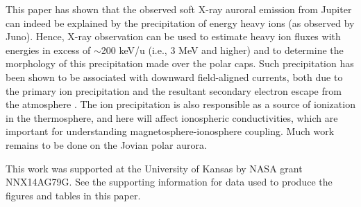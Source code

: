 \documentclass[draft]{agujournal2018}
\begin{document}
This paper has shown that the observed soft X-ray auroral emission from Jupiter can indeed be explained by the precipitation of energy heavy ions (as observed by Juno).
Hence, X-ray observation can be used to estimate heavy ion fluxes with energies in excess of $\sim$200 keV/u (i.e., 3 MeV and higher) and to determine the morphology of this precipitation made over the polar caps.
Such precipitation has been shown to be associated with downward field-aligned currents, both due to the primary ion precipitation and the resultant secondary electron escape from the atmosphere \citep{cravens2003,houston2018,ozak2010,ozak2013}.
The ion precipitation is also responsible as a source of ionization in the thermosphere, and here will affect ionospheric conductivities, which are important for understanding magnetosphere-ionosphere coupling.
Much work remains to be done on the Jovian polar aurora.

\clearpage

%
%
%
%
%
%
%
%


\acknowledgments
This work was supported at the University of Kansas by NASA grant NNX14AG79G. See the supporting information for data used to produce the figures and tables in this paper.





\appendix



\end{document}
